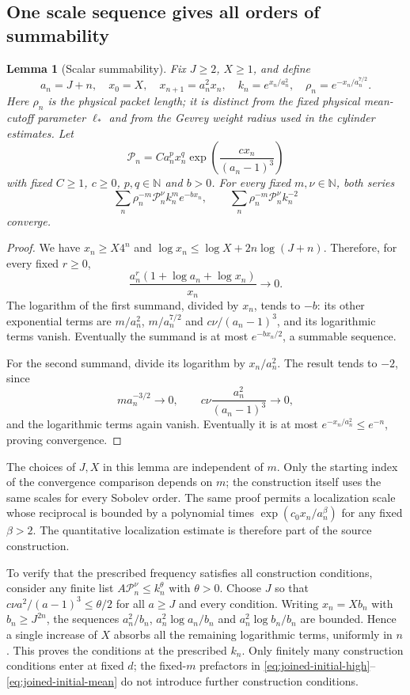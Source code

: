 \documentclass[11pt]{article}
\newcommand{\N}{\mathbb N}
\newtheorem{lemma}[theorem]{Lemma}
\theoremstyle{definition}
\begin{document}
\subsection{One scale sequence gives all orders of summability}
\begin{lemma}[Scalar summability]\label{lem:initial-scalar-sum}
Fix $J\ge2$, $X\ge1$, and define
\[
 a_n=J+n,\quad x_0=X,\quad x_{n+1}=a_n^2x_n,
 \quad k_n=e^{x_n/a_n^2},\quad \rho_n=e^{-x_n/a_n^{7/2}}.
\]
Here $\rho_n$ is the physical packet length; it is distinct from the
fixed physical mean-cutoff parameter $\ell_*$ and from the Gevrey
weight radius used in the cylinder estimates. Let
\[
 \mathcal P_n=C a_n^p x_n^q
           \exp\left(\frac{c x_n}{(a_n-1)^3}\right)
\]
with fixed $C\ge1$, $c\ge0$, $p,q\in\N$ and $b>0$. For every fixed
$m,\nu\in\N$, both series
\[
 \sum_n\rho_n^{-m}\mathcal P_n^\nu k_n^m e^{-b x_n},
 \qquad
 \sum_n\rho_n^{-m}\mathcal P_n^\nu k_n^{-2}
\]
converge.
\end{lemma}
\begin{proof}
We have $x_n\ge X4^n$ and
$\log x_n\le\log X+2n\log(J+n)$. Therefore, for every fixed $r\ge0$,
\[
 \frac{a_n^r(1+\log a_n+\log x_n)}{x_n}\longrightarrow0.
\]
The logarithm of the first summand, divided by $x_n$, tends to $-b$:
its other exponential terms are $m/a_n^2$, $m/a_n^{7/2}$ and
$c\nu/(a_n-1)^3$, and its logarithmic terms vanish. Eventually the summand
is at most $e^{-b x_n/2}$, a summable sequence.

For the second summand, divide its logarithm by $x_n/a_n^2$. The result
tends to $-2$, since
\[
 ma_n^{-3/2}\to0,\qquad
 c\nu\frac{a_n^2}{(a_n-1)^3}\to0,
\]
and the logarithmic terms again vanish. Eventually it is at most
$e^{-x_n/a_n^2}\le e^{-n}$, proving convergence.
\end{proof}

The choices of $J,X$ in this lemma are independent of $m$. Only the
starting index of the convergence comparison depends on $m$; the
construction itself uses the same scales for every Sobolev order.
The same proof permits a localization scale whose reciprocal is bounded
by a polynomial times $\exp(c_0x_n/a_n^\beta)$ for any fixed $\beta>2$.
The quantitative localization estimate is therefore part of the
source construction.

To verify that the prescribed frequency satisfies all construction
conditions, consider any finite list $A\mathcal P_n^\nu\le k_n^\theta$ with
$\theta>0$. Choose $J$ so that
$c\nu a^2/(a-1)^3\le\theta/2$ for all $a\ge J$ and every condition.
Writing $x_n=Xb_n$ with $b_n\ge J^{2n}$, the sequences
$a_n^2/b_n$, $a_n^2\log a_n/b_n$ and $a_n^2\log b_n/b_n$ are bounded.
Hence a single increase of $X$ absorbs all the remaining logarithmic terms,
uniformly in $n$. This proves the conditions at the prescribed $k_n$.
Only finitely many construction conditions enter at fixed $d$; the fixed-$m$
prefactors in \eqref{eq:joined-initial-high}--\eqref{eq:joined-initial-mean}
do not introduce further construction conditions.
\end{document}
